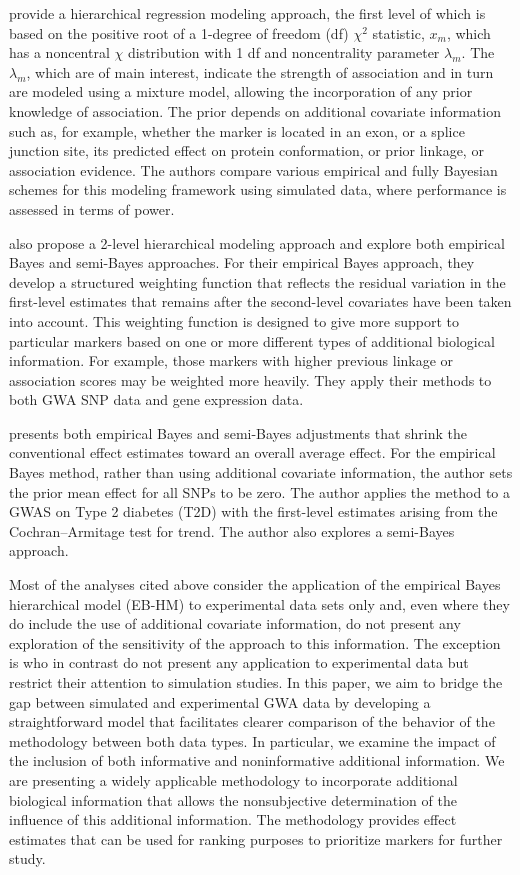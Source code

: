 \documentclass[oupdraft]{bio}
\begin{document}
\citet{Wahba:1990}
provide a hierarchical regression modeling approach, the first
level of which is based on the positive root of a 1-degree of
freedom (df) $\chi^2$ statistic, $x_m$, which has a noncentral
$\chi$ distribution with 1 df and noncentrality parameter
$\lambda_m$. The $\lambda_m$, which are of main interest,
indicate the strength of association and in turn are modeled
using a mixture model, allowing the incorporation of any prior
knowledge of association. The prior depends on additional
covariate information such as, for example, whether the marker
is located in an exon, or a splice junction site, its predicted
effect on protein conformation, or prior linkage, or association
evidence. The authors compare various empirical and fully
Bayesian schemes for this modeling framework using simulated
data, where performance is assessed in terms of power.

\citet{Brown:1989}
also propose a 2-level hierarchical modeling approach and explore
both empirical Bayes and semi-Bayes approaches. For their empirical
Bayes approach, they develop a structured weighting function
that reflects the residual variation in the first-level estimates
that remains after the second-level covariates have been taken
into account. This weighting function is designed to give more
support to particular markers based on one or more different
types of additional biological information. For example, those
markers with higher previous linkage or association scores may
be weighted more heavily. They apply their methods to both GWA
SNP data and gene expression data.

\citet{SAS_Institute:1999}
presents both empirical Bayes and semi-Bayes adjustments that
shrink the conventional effect estimates toward an overall
average effect. For the empirical Bayes method, rather than
using additional covariate information, the author sets the prior
mean effect for all SNPs to be zero. The author applies the
method to a GWAS on Type 2 diabetes (T2D) with the first-level
estimates arising from the Cochran--Armitage test for trend.
The author also explores a semi-Bayes approach.

Most of the analyses cited above consider the application of the
empirical Bayes hierarchical model (EB-HM) to experimental data
sets only and, even where they do include the use of additional
covariate information, do not present any exploration of the
sensitivity of the approach to this information. The exception is
\citet{Fimmers_Seuchter:1989}
who in contrast do not present any application to experimental
data but restrict their attention to simulation studies. In
this paper, we aim to bridge the gap between simulated and
experimental GWA data by developing a straightforward model
that facilitates clearer comparison of the behavior of the
methodology between both data types. In particular, we examine
the impact of the inclusion of both informative and
noninformative additional information. We are presenting a
widely applicable methodology to incorporate additional biological
information that allows the nonsubjective determination of the
influence of this additional information. The methodology provides
effect estimates that can be used for ranking purposes to
prioritize markers for further study.
\end{document}

